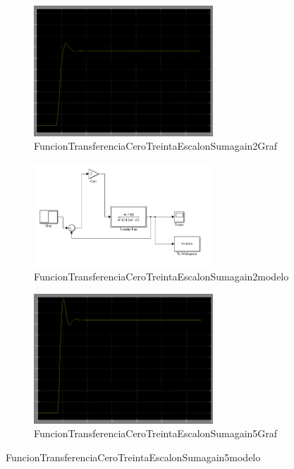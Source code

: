 \documentclass[]{article}
\begin{document}
\begin{figure}[h!]
	\centering
	\includegraphics[width=0.6\textwidth]{Imagenes/FuncionTransferenciaCeroTreintaEscalonSumagain2Graf}
	\caption{FuncionTransferenciaCeroTreintaEscalonSumagain2Graf}
	\label{fig:FuncionTransferenciaCeroTreintaEscalonSumagain2Graf}
\end{figure}

\begin{figure}[h!]
	\centering
	\includegraphics[width=0.6\textwidth]{Imagenes/FuncionTransferenciaCeroTreintaEscalonSumagain2modelo}
	\caption{FuncionTransferenciaCeroTreintaEscalonSumagain2modelo}
	\label{fig:FuncionTransferenciaCeroTreintaEscalonSumagain2modelo}
\end{figure}

\begin{figure}[h!]
	\centering
	\includegraphics[width=0.6\textwidth]{Imagenes/FuncionTransferenciaCeroTreintaEscalonSumagain5Graf}
	\caption{FuncionTransferenciaCeroTreintaEscalonSumagain5Graf}
	\label{fig:FuncionTransferenciaCeroTreintaEscalonSumagain5Graf}
\end{figure}
FuncionTransferenciaCeroTreintaEscalonSumagain5modelo
\end{document}
